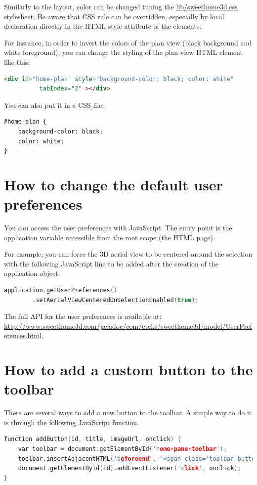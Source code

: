 \documentclass[a4paper]{report}
\begin{document}
Similarly to the layout, color can be changed tuning the \url{lib/sweethome3d.css} stylesheet. Be aware that CSS rule can be overridden, especially by local declaration directly in the HTML style attribute of the elements. 

For instance, in order to invert the colors of the plan view (black background and white foreground), you can change the styling of the plan view HTML element like this:

\begin{lstlisting}[language=html]
  <div id="home-plan" style="background-color: black; color: white"         
          tabIndex="2" ></div>
\end{lstlisting}

You can also put it in a CSS file:

\begin{lstlisting}[language=html]
#home-plan {
	background-color: black; 
	color: white;
}         
\end{lstlisting}

\section{How to change the default user preferences}

You can access the user preferences with JavaScript. The entry point is the application variable accessible from the root scope (the HTML page).

For example, you can force the 3D aerial view to be centered around the selection with the following JavaScript line to be added after the creation of the application object:

\begin{lstlisting}[language=c++]
	application.getUserPreferences()
		.setAerialViewCenteredOnSelectionEnabled(true);
\end{lstlisting}

The full API for the user preferences is available at: \url{http://www.sweethome3d.com/javadoc/com/eteks/sweethome3d/model/UserPreferences.html}.

\section{How to add a custom button to the toolbar}

There are several ways to add a new button to the toolbar. A simple way to do it is through the following JavaScript function.

\begin{lstlisting}[language=c++]
function addButton(id, title, imageUrl, onclick) {
    var toolbar = document.getElementById('home-pane-toolbar');
    toolbar.insertAdjacentHTML('beforeend', "<span class='toolbar-button-group'><button title='"+title+"' class='toolbar-button toggle selected' id='"+id+"' style='background-image: url(&quot;"+imageUrl+"&quot;); background-position: center center; background-repeat: no-repeat;background-color:#fff'></button></span>");
    document.getElementById(id).addEventListener('click', onclick);
}
\end{lstlisting}
\end{document}
